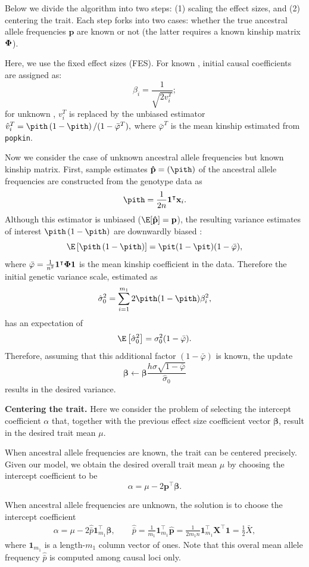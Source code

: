 \documentclass[11pt]{article}
\newcommand{\kinMat}{%
  \ensuremath{%
    \mathbf{\Phi}
  }%
  \xspace%
}%
\begin{document}
Below we divide the algorithm into two steps: (1) scaling the effect sizes, and (2) centering the trait.
Each step forks into two cases: whether the true ancestral allele frequencies $\mathbf{p}$ are known or not (the latter requires a known kinship matrix $\kinMat$).

Here, we use the fixed effect sizes (FES). For known \pit, initial causal coefficients are assigned as:
$$
\beta_i = \frac{1}{ \sqrt{ 2 v_i^T } };
$$
for unknown \pit,  $v_i^T$ is replaced by the unbiased estimator \citep{ochoa_estimating_2021}
$
\hat{v}_i^T
=
\pith \left( 1 - \pith \right) / ( 1 - \bar{\varphi}^T )
,
$
where $\bar{\varphi}^T$ is the mean kinship estimated from \texttt{popkin}.


Now we consider the case of unknown ancestral allele frequencies but known kinship matrix.
First, sample estimates $\mathbf{\hat{p}} = (\pith)$ of the ancestral allele frequencies are constructed from the genotype data as
$$
\pith
=
\frac{1}{2n} \mathbf{1}^\intercal \mathbf{x}_i
.
$$
Although this estimator is unbiased ($\E[\mathbf{\hat{p}}] = \mathbf{p}$), the resulting variance estimates of interest $\pith \left( 1-\pith \right)$ are downwardly biased \citep{ochoa_estimating_2021}:
$$
\E \left[ \pith \left( 1-\pith \right) \right]
=
\pit(1-\pit) (1 - \bar{\varphi})
,
$$
where $\bar{\varphi} = \frac{1}{n^2} \mathbf{1}^\intercal \kinMat \mathbf{1}$ is the mean kinship coefficient in the data.
Therefore the initial genetic variance scale, estimated as
$$
\hat{\sigma}^2_0
=
\sum_{i=1}^{m_1} 2 \pith (1-\pith) \beta_i^2
,
$$
has an expectation of
$$
\E \left[ \hat{\sigma}^2_0 \right]
=
\sigma^2_0 (1 - \bar{\varphi})
.
$$
Therefore, assuming that this additional factor $(1 - \bar{\varphi})$ is known, the update
$$
\boldsymbol{\beta}
\leftarrow
\boldsymbol{\beta} \frac{ h \sigma \sqrt{1-\bar{\varphi}} }{\hat{\sigma}_0}
$$
results in the desired variance.

\textbf{Centering the trait.}
Here we consider the problem of selecting the intercept coefficient $\alpha$ that, together with the previous effect size coefficient vector $\boldsymbol{\beta}$, result in the desired trait mean $\mu$.

When ancestral allele frequencies are known, the trait can be centered precisely.
Given our model, we obtain the desired overall trait mean $\mu$ by choosing the intercept coefficient to be
$$
\alpha 
=
\mu - 2 \mathbf{p}^\intercal \boldsymbol{\beta}
.
$$

When ancestral allele frequencies are unknown, the solution is to choose the intercept coefficient
\begin{align*}
  \alpha 
  =
  \mu - 2 \hat{\bar{p}} \mathbf{1}_{m_1}^\intercal \boldsymbol{\beta}
  , \quad\quad
  \hat{\bar{p}}
  =
  \frac{1}{m_1} \mathbf{1}_{m_1}^\intercal \mathbf{\hat{p}}
  =
  \frac{1}{ 2 m_1 n } \mathbf{1}_{m_1}^\intercal \mathbf{X}^\intercal \mathbf{1}
  =
  \frac{1}{2} \bar{X}
  ,
\end{align*}
where $\mathbf{1}_{m_1}$ is a length-$m_1$ column vector of ones.
Note that this overal mean allele frequency $\hat{\bar{p}}$ is computed among causal loci only.
\end{document}
